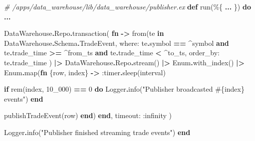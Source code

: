 \documentclass[
]{book}
\newenvironment{Shaded}{\begin{snugshade}}{\end{snugshade}}
\newcommand{\CommentTok}[1]{\textcolor[rgb]{0.56,0.35,0.01}{\textit{#1}}}
\newcommand{\ConstantTok}[1]{\textcolor[rgb]{0.00,0.00,0.00}{#1}}
\newcommand{\ControlFlowTok}[1]{\textcolor[rgb]{0.13,0.29,0.53}{\textbf{#1}}}
\newcommand{\DecValTok}[1]{\textcolor[rgb]{0.00,0.00,0.81}{#1}}
\newcommand{\KeywordTok}[1]{\textcolor[rgb]{0.13,0.29,0.53}{\textbf{#1}}}
\newcommand{\NormalTok}[1]{#1}
\newcommand{\OperatorTok}[1]{\textcolor[rgb]{0.81,0.36,0.00}{\textbf{#1}}}
\newcommand{\OtherTok}[1]{\textcolor[rgb]{0.56,0.35,0.01}{#1}}
\newcommand{\StringTok}[1]{\textcolor[rgb]{0.31,0.60,0.02}{#1}}
\newcommand{\VariableTok}[1]{\textcolor[rgb]{0.00,0.00,0.00}{#1}}
\begin{document}
\begin{Shaded}
\begin{Highlighting}[]
  \CommentTok{\# /apps/data\_warehouse/lib/data\_warehouse/publisher.ex}
  \KeywordTok{def}\NormalTok{ run(\%\{}
        \OperatorTok{...}
\NormalTok{      \}) }\KeywordTok{do}
    \OperatorTok{...}

    \ConstantTok{DataWarehouse}\OperatorTok{.}\ConstantTok{Repo}\OperatorTok{.}\NormalTok{transaction(}
      \KeywordTok{fn} \OperatorTok{{-}\textgreater{}}
\NormalTok{        from(te }\KeywordTok{in} \ConstantTok{DataWarehouse}\OperatorTok{.}\ConstantTok{Schema}\OperatorTok{.}\ConstantTok{TradeEvent}\NormalTok{,}
          \VariableTok{where:}
\NormalTok{            te}\OperatorTok{.}\NormalTok{symbol }\OperatorTok{==} \OperatorTok{\^{}}\NormalTok{symbol }\KeywordTok{and}
\NormalTok{              te}\OperatorTok{.}\NormalTok{trade\_time }\OperatorTok{\textgreater{}=} \OperatorTok{\^{}}\NormalTok{from\_ts }\KeywordTok{and}
\NormalTok{              te}\OperatorTok{.}\NormalTok{trade\_time }\OperatorTok{\textless{}} \OperatorTok{\^{}}\NormalTok{to\_ts,}
          \VariableTok{order\_by:}\NormalTok{ te}\OperatorTok{.}\NormalTok{trade\_time}
\NormalTok{        )}
        \OperatorTok{|\textgreater{}} \ConstantTok{DataWarehouse}\OperatorTok{.}\ConstantTok{Repo}\OperatorTok{.}\NormalTok{stream()}
        \OperatorTok{|\textgreater{}} \ConstantTok{Enum}\OperatorTok{.}\NormalTok{with\_index()}
        \OperatorTok{|\textgreater{}} \ConstantTok{Enum}\OperatorTok{.}\NormalTok{map(}\KeywordTok{fn}\NormalTok{ \{row, index\} }\OperatorTok{{-}\textgreater{}}
          \VariableTok{:timer}\OperatorTok{.}\NormalTok{sleep(interval)}

          \ControlFlowTok{if}\NormalTok{ rem(index, }\DecValTok{10\_000}\NormalTok{) }\OperatorTok{==} \DecValTok{0} \KeywordTok{do}
            \ConstantTok{Logger}\OperatorTok{.}\NormalTok{info(}\StringTok{"Publisher broadcasted }\OtherTok{\#\{}\NormalTok{index}\OtherTok{\}}\StringTok{ events"}\NormalTok{)}
          \KeywordTok{end}

\NormalTok{          publishTradeEvent(row)}
        \KeywordTok{end}\NormalTok{)}
      \KeywordTok{end}\NormalTok{,}
      \VariableTok{timeout:} \VariableTok{:infinity}
\NormalTok{    )}

    \ConstantTok{Logger}\OperatorTok{.}\NormalTok{info(}\StringTok{"Publisher finished streaming trade events"}\NormalTok{)}
  \KeywordTok{end}
\end{Highlighting}
\end{Shaded}
\end{document}
